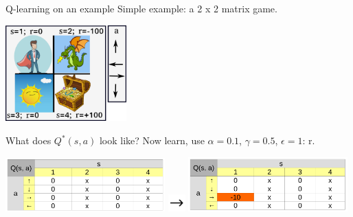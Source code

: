 \documentclass{beamer}
\begin{document}
\begin{frame}{Q-learning on an example}
    Simple example: a 2 x 2 matrix game.

    \begin{center}
      \includegraphics[width=0.35\textwidth]{./Figures/ANNs_reinforcement_learning/Q_learning_example}
    \end{center}

    What does $Q^{*}(s, a)$ look like? Now learn, use $\alpha = 0.1$, $\gamma = 0.5$, $\epsilon = 1$: r.

    \begin{center}
      \includegraphics[width=0.46\textwidth]{./Figures/ANNs_reinforcement_learning/Q_learning_example_0}
      \includegraphics[width=0.05\textwidth]{./Figures/ANNs_reinforcement_learning/arrow_right}
      \includegraphics[width=0.46\textwidth]{./Figures/ANNs_reinforcement_learning/Q_learning_example_1}
    \end{center}
\end{frame}
\end{document}
